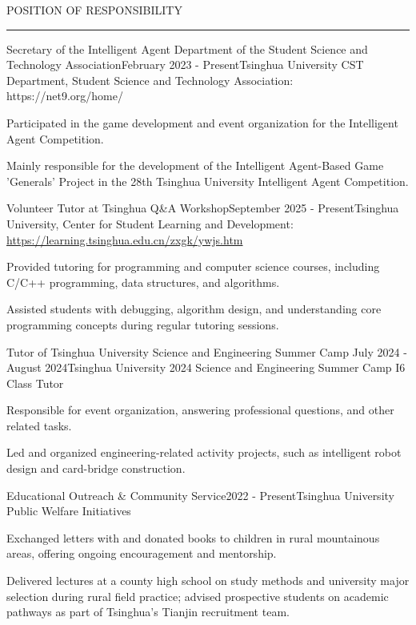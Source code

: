 \documentclass{resume_rhodes} %
\def\sectionskip{\smallskip}
\def\sectionlineskip{\smallskip}
\renewenvironment{rSection}[1]{
\sectionskip
\textcolor{TsinghuaPurple}{\MakeUppercase{#1}}
\sectionlineskip
\hrule
\begin{list}{}{
\setlength{\leftmargin}{0em}
}
\item[]
}{
\end{list}
}
\begin{document}
  
\begin{rSection}{POSITION OF RESPONSIBILITY}

\begin{rSubsection}{Secretary of the Intelligent Agent Department of the Student Science and Technology Association}{February 2023 - Present}{Tsinghua University CST Department, Student Science and Technology Association: https://net9.org/home/}{}              
\item Participated in the game development and event organization for the Intelligent Agent Competition.
\item Mainly responsible for the development of the Intelligent Agent-Based Game 'Generals' Project in the 28th Tsinghua University Intelligent Agent Competition.
\end{rSubsection}  

\begin{rSubsection}{Volunteer Tutor at Tsinghua Q\&A Workshop}{September 2025 - Present}{Tsinghua University, Center for Student Learning and Development: \url{https://learning.tsinghua.edu.cn/zxgk/ywjs.htm}}{}
\item Provided tutoring for programming and computer science courses, including C/C++ programming, data structures, and algorithms.
\item Assisted students with debugging, algorithm design, and understanding core programming concepts during regular tutoring sessions.
\end{rSubsection}

\begin{rSubsection}{Tutor of Tsinghua University Science and Engineering Summer Camp} {July 2024 - August 2024}{Tsinghua University 2024 Science and Engineering Summer Camp I6 Class Tutor}{} 
\item Responsible for event organization, answering professional questions, and other related tasks.
\item Led and organized engineering-related activity projects, such as intelligent robot design and card-bridge construction.
\end{rSubsection}

\begin{rSubsection}{Educational Outreach \& Community Service}{2022 - Present}{Tsinghua University Public Welfare Initiatives}{}
\item Exchanged letters with and donated books to children in rural mountainous areas, offering ongoing encouragement and mentorship.
\item Delivered lectures at a county high school on study methods and university major selection during rural field practice; advised prospective students on academic pathways as part of Tsinghua's Tianjin recruitment team.
\end{rSubsection}

\end{rSection}
\end{document}

